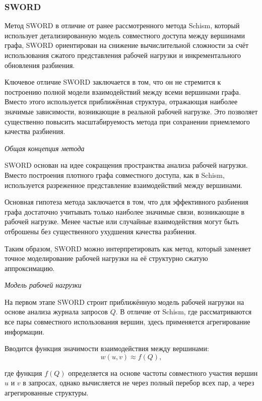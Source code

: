 \subsubsection{SWORD}

Метод SWORD \cite{sword} в отличие от ранее рассмотренного метода Schism, который использует детализированную модель совместного доступа между вершинами графа, SWORD ориентирован на снижение вычислительной сложности за счёт использования сжатого представления рабочей нагрузки и инкрементального обновления разбиения.

Ключевое отличие SWORD заключается в том, что он не стремится к построению полной модели взаимодействий между всеми вершинами графа. Вместо этого используется приближённая структура, отражающая наиболее значимые зависимости, возникающие в реальной рабочей нагрузке. Это позволяет существенно повысить масштабируемость метода при сохранении приемлемого качества разбиения.

\textit{Общая концепция метода}

SWORD основан на идее сокращения пространства анализа рабочей нагрузки. Вместо построения плотного графа совместного доступа, как в Schism, используется разреженное представление взаимодействий между вершинами.

Основная гипотеза метода заключается в том, что для эффективного разбиения графа достаточно учитывать только наиболее значимые связи, возникающие в рабочей нагрузке. Менее частые или случайные взаимодействия могут быть отброшены без существенного ухудшения качества разбиения.

Таким образом, SWORD можно интерпретировать как метод, который заменяет точное моделирование рабочей нагрузки на её структурно сжатую аппроксимацию.

\textit{Модель рабочей нагрузки}

На первом этапе SWORD строит приближённую модель рабочей нагрузки на основе анализа журнала запросов $Q$. В отличие от Schism, где рассматриваются все пары совместного использования вершин, здесь применяется агрегирование информации.

Вводится функция значимости взаимодействия между вершинами:
\begin{equation*}
w(u, v) \approx f(Q),
\end{equation*}

где функция $f(Q)$ определяется на основе частоты совместного участия вершин $u$ и $v$ в запросах, однако вычисляется не через полный перебор всех пар, а через агрегированные структуры.


